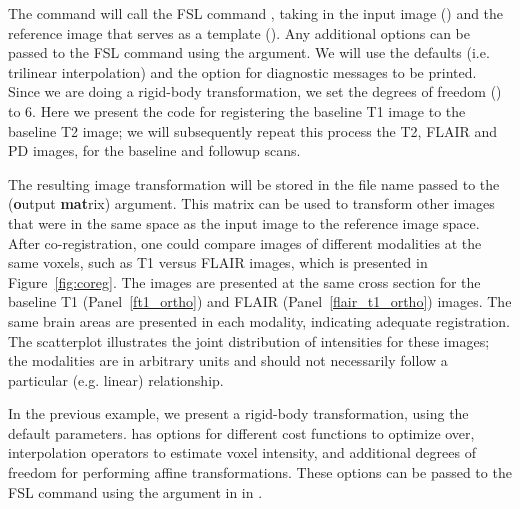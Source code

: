 The  command  will call the FSL command , taking in the input image () and the reference image that serves as a template ().  Any additional options can be passed to the FSL command using the  argument.  We will use the defaults (i.e. trilinear interpolation) and the  option for diagnostic messages to be printed.  Since we are doing a rigid-body transformation, we set the degrees of freedom () to 6. Here we present the code for registering the baseline T1 image to the baseline T2 image; we will subsequently repeat this process the T2, FLAIR and PD images, for the baseline and followup scans. 
\begin{knitrout}
\color{fgcolor}\begin{kframe}
\begin{alltt}
\hlstd{(} \hlstd{=} \hlstd{,}
         \hlstd{=} \hlstd{,}
         \hlstd{=} \hlstd{,}
         \hlstd{=} \hlstd{,}
         \hlstd{=} \hlstd{,}  \hlstd{=} \hlstd{)}
\end{alltt}
\end{kframe}
\end{knitrout}



The resulting image transformation will be stored in the file name passed to the  ({\bf o}utput {\bf mat}rix) argument.  This matrix can be used to transform other images that were in the same space as the input image to the reference image space.  After co-registration, one could compare images of different modalities at the same voxels, such as T1 versus FLAIR images, which is presented in Figure~\ref{fig:coreg}.  The images are presented at the same cross section for the baseline T1 (Panel~\ref{ft1_ortho}) and FLAIR (Panel~\ref{flair_t1_ortho}) images.  The same brain areas are presented in each modality, indicating adequate registration.  The scatterplot illustrates the joint distribution of intensities for these images; the modalities are in arbitrary units and should not necessarily follow a particular (e.g. linear) relationship.


In the previous example, we present a rigid-body transformation, using the default parameters.   has options for different cost functions to optimize over, interpolation operators to estimate voxel intensity, and additional degrees of freedom for performing affine transformations.  These options can be passed to the FSL  command using the  argument in  in .  

